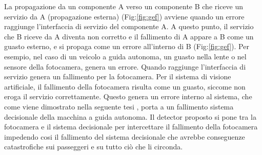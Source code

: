 \documentclass[14pt]{extarticle}
\begin{document}
 La propagazione da un componente A verso un componente B che riceve un servizio da A (propagazione esterna) (Fig:\ref{fig:gef}) avviene
quando un errore raggiunge l'interfaccia di servizio del componente A. A questo punto, il servizio che B riceve da A diventa non corretto e il fallimento di
A appare a B come un guasto esterno, e si propaga come un errore all’interno
di B (Fig:\ref{fig:gef}). 
Per esempio, nel caso di un veicolo a guida autonoma, un guasto nella lente o nel sensore della fotocamera,  genera un errore. Quando raggiunge l'interfaccia di servizio  genera un fallimento per la fotocamera. Per il sistema di visione artificiale, il fallimento della fotocamera risulta come un guasto, siccome non eroga il servizio correttamente. Questo genera un errore interno al sistema, che come viene dimostrato nella seguente tesi \cite{secci2020failures}, porta a un fallimento sistema decisionale della macchina a guida autonoma. Il detector proposto si pone tra la fotocamera e il sistema decisionale per intercettare il fallimento della fotocamera impedendo cosi il fallimento del sistema decisionale che avrebbe conseguenze catastrofiche sui passeggeri e su tutto ciò che li circonda.
\end{document}
